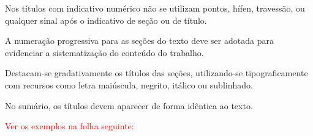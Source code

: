 Nos títulos com indicativo numérico não se utilizam pontos, hífen, travessão, ou qualquer sinal após o indicativo de seção ou de título. 

A numeração progressiva para as seções do texto deve ser adotada para evidenciar a sistematização do conteúdo do trabalho. 

Destacam-se gradativamente os títulos das seções, utilizando-se tipograficamente com recursos como letra maiúscula, negrito, itálico ou sublinhado. 

No sumário, os títulos devem aparecer de forma idêntica ao texto.

\textcolor{red}{Ver os exemplos na folha seguinte:}

